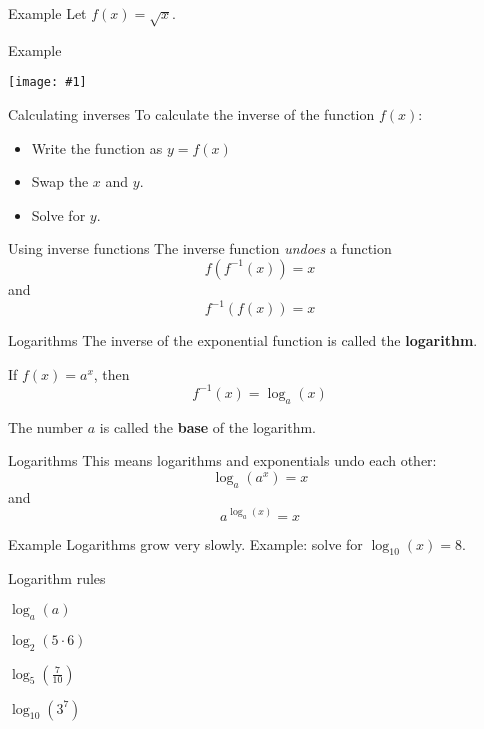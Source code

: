 \documentclass[t]{beamer}
\newenvironment{fpi}
  {\itemize[nolistsep,itemsep=\fill]}
  {\vfill\enditemize}
\newcommand{\img}[1]{
\vfill
\texttt{[image: \#1]}
\vfill
}
\begin{document}
\begin{frame}{Example}
Let $f(x) = \sqrt{x}$. 
\end{frame}

\begin{frame}{Example}
\img{inv}
\end{frame}

\begin{frame}{Calculating inverses}
To calculate the inverse of the function $f(x)$:
\begin{itemize}
\item Write the function as $y = f(x)$
\item Swap the $x$ and $y$.
\item Solve for $y$.
\end{itemize}
\end{frame}


\begin{frame}{Using inverse functions}
The inverse function \emph{undoes} a function
$$ f (f^{-1}(x))  = x $$
and
$$ f^{-1} (f(x))  = x $$
\end{frame}

\begin{frame}{Logarithms}
The inverse of the exponential function is called the \textbf{logarithm}.

If $f(x) = a^x$, then 
$$f^{-1}(x) = \log_a(x)$$

The number $a$ is called the \textbf{base} of the logarithm.
\end{frame}

\begin{frame}{Logarithms}
This means logarithms and exponentials undo each other:
$$\log_a(a^x) = x$$
and 
$$a^{\log_a(x)} = x$$
\end{frame}

\begin{frame}{Example}
Logarithms grow very slowly.  Example: solve for  $\log_{10}(x) = 8$.
\end{frame}

\begin{frame}{Logarithm rules}
\begin{fpi}
\item  $\displaystyle \log_a(a)$
\item  $\displaystyle \log_2(5 \cdot 6)$
\item  $\displaystyle \log_5(\frac{7}{10})$
\item $\displaystyle \log_{10}(3^7)$
\end{fpi}
\end{frame}
\end{document}
